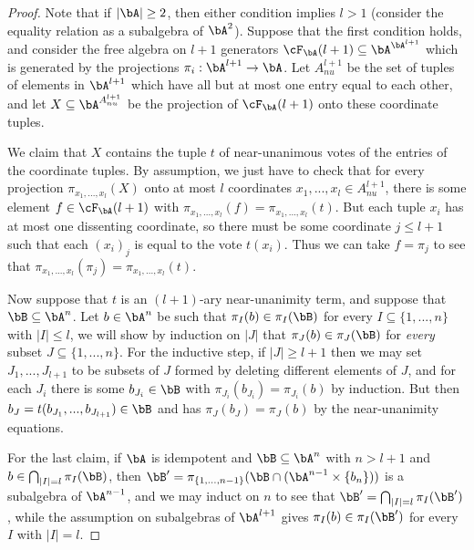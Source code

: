 \begin{proof} Note that if $|\bA| \ge 2$, then either condition implies $l > 1$ (consider the equality relation as a subalgebra of $\bA^2$). Suppose that the first condition holds, and consider the free algebra on $l+1$ generators $\cF_\bA(l+1) \subseteq \bA^{\bA^{l+1}}$ which is generated by the projections $\pi_i : \bA^{l+1} \rightarrow \bA$. Let $A^{l+1}_{nu}$ be the set of tuples of elements in $\bA^{l+1}$ which have all but at most one entry equal to each other, and let $X \subseteq \bA^{A^{l+1}_{nu}}$ be the projection of $\cF_\bA(l+1)$ onto these coordinate tuples.

We claim that $X$ contains the tuple $t$ of near-unanimous votes of the entries of the coordinate tuples. By assumption, we just have to check that for every projection $\pi_{x_1, ..., x_l}(X)$ onto at most $l$ coordinates $x_1, ..., x_l \in A^{l+1}_{nu}$, there is some element $f \in \cF_\bA(l+1)$ with $\pi_{x_1, ..., x_l}(f) = \pi_{x_1, ..., x_l}(t)$. But each tuple $x_i$ has at most one dissenting coordinate, so there must be some coordinate $j \le l+1$ such that each $(x_i)_j$ is equal to the vote $t(x_i)$. Thus we can take $f = \pi_j$ to see that $\pi_{x_1, ..., x_l}(\pi_j) = \pi_{x_1, ..., x_l}(t)$.

Now suppose that $t$ is an $(l+1)$-ary near-unanimity term, and suppose that $\bB \subseteq \bA^n$. Let $b \in \bA^n$ be such that $\pi_I(b) \in \pi_I(\bB)$ for every $I \subseteq \{1, ..., n\}$ with $|I| \le l$, we will show by induction on $|J|$ that $\pi_J(b) \in \pi_J(\bB)$ for \emph{every} subset $J \subseteq \{1, ..., n\}$. For the inductive step, if $|J| \ge l+1$ then we may set $J_1, ..., J_{l+1}$ to be subsets of $J$ formed by deleting different elements of $J$, and for each $J_i$ there is some $b_{J_i} \in \bB$ with $\pi_{J_i}(b_{J_i}) = \pi_{J_i}(b)$ by induction. But then $b_J = t(b_{J_1}, ..., b_{J_{l+1}}) \in \bB$ and has $\pi_J(b_J) = \pi_J(b)$ by the near-unanimity equations.

For the last claim, if $\bA$ is idempotent and $\bB \subseteq \bA^n$ with $n > l+1$ and $b \in \bigcap_{|I| = l} \pi_I(\bB)$, then $\bB' = \pi_{\{1, ..., n-1\}}(\bB \cap (\bA^{n-1}\times \{b_n\}))$ is a subalgebra of $\bA^{n-1}$, and we may induct on $n$ to see that $\bB' = \bigcap_{|I| = l} \pi_I(\bB')$, while the assumption on subalgebras of $\bA^{l+1}$ gives $\pi_I(b) \in \pi_I(\bB')$ for every $I$ with $|I| = l$.
\end{proof}

